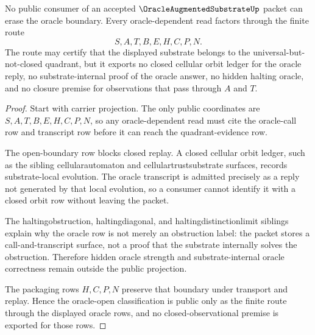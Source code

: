 \begin{theorem}
\label{thm:oracle-augmented-substrate-oracle-nonescape}
No public consumer of an accepted $\OracleAugmentedSubstrateUp$ packet can erase the oracle boundary. Every oracle-dependent read factors through the finite route
$$
S,A,T,B,E,H,C,P,N .
$$
The route may certify that the displayed substrate belongs to the universal-but-not-closed quadrant, but it exports no closed cellular orbit ledger for the oracle reply, no substrate-internal proof of the oracle answer, no hidden halting oracle, and no closure premise for observations that pass through $A$ and $T$.
\end{theorem}
\begin{proof}
Start with carrier projection. The only public coordinates are $S,A,T,B,E,H,C,P,N$, so any oracle-dependent read must cite the oracle-call row and transcript row before it can reach the quadrant-evidence row.

The open-boundary row blocks closed replay. A closed cellular orbit ledger, such as the sibling cellularautomaton and cellulartrustsubstrate surfaces, records substrate-local evolution. The oracle transcript is admitted precisely as a reply not generated by that local evolution, so a consumer cannot identify it with a closed orbit row without leaving the packet.

The haltingobstruction, haltingdiagonal, and haltingdistinctionlimit siblings explain why the oracle row is not merely an obstruction label: the packet stores a call-and-transcript surface, not a proof that the substrate internally solves the obstruction. Therefore hidden oracle strength and substrate-internal oracle correctness remain outside the public projection.

The packaging rows $H,C,P,N$ preserve that boundary under transport and replay. Hence the oracle-open classification is public only as the finite route through the displayed oracle rows, and no closed-observational premise is exported for those rows.
\end{proof}

